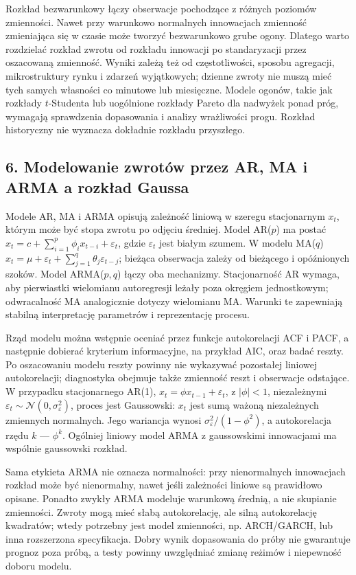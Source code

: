 \documentclass[11pt,a4paper]{article}
\begin{document}
Rozkład bezwarunkowy łączy obserwacje pochodzące z różnych poziomów zmienności. Nawet przy warunkowo normalnych innowacjach zmienność zmieniająca się w czasie może tworzyć bezwarunkowo grube ogony. Dlatego warto rozdzielać rozkład zwrotu od rozkładu innowacji po standaryzacji przez oszacowaną zmienność. Wyniki zależą też od częstotliwości, sposobu agregacji, mikrostruktury rynku i zdarzeń wyjątkowych; dzienne zwroty nie muszą mieć tych samych własności co minutowe lub miesięczne. Modele ogonów, takie jak rozkłady \(t\)-Studenta lub uogólnione rozkłady Pareto dla nadwyżek ponad próg, wymagają sprawdzenia dopasowania i analizy wrażliwości progu. Rozkład historyczny nie wyznacza dokładnie rozkładu przyszłego.

\subsection{6. Modelowanie zwrotów przez AR, MA i ARMA a rozkład Gaussa}

Modele AR, MA i ARMA opisują zależność liniową w szeregu stacjonarnym \(x_t\), którym może być stopa zwrotu po odjęciu średniej. Model AR(\(p\)) ma postać \(x_t=c+\sum_{i=1}^{p}\phi_i x_{t-i}+\varepsilon_t\), gdzie \(\varepsilon_t\) jest białym szumem. W modelu MA(\(q\)) \(x_t=\mu+\varepsilon_t+\sum_{j=1}^{q}\theta_j\varepsilon_{t-j}\); bieżąca obserwacja zależy od bieżącego i opóźnionych szoków. Model ARMA(\(p,q\)) łączy oba mechanizmy. Stacjonarność AR wymaga, aby pierwiastki wielomianu autoregresji leżały poza okręgiem jednostkowym; odwracalność MA analogicznie dotyczy wielomianu MA. Warunki te zapewniają stabilną interpretację parametrów i reprezentację procesu.

Rząd modelu można wstępnie oceniać przez funkcje autokorelacji ACF i PACF, a następnie dobierać kryterium informacyjne, na przykład AIC, oraz badać reszty. Po oszacowaniu modelu reszty powinny nie wykazywać pozostałej liniowej autokorelacji; diagnostyka obejmuje także zmienność reszt i obserwacje odstające. W przypadku stacjonarnego AR(1), \(x_t=\phi x_{t-1}+\varepsilon_t\), z \(|\phi|<1\), niezależnymi \(\varepsilon_t\sim\mathcal N(0,\sigma_\varepsilon^2)\), proces jest Gaussowski: \(x_t\) jest sumą ważoną niezależnych zmiennych normalnych. Jego wariancja wynosi \(\sigma_\varepsilon^2/(1-\phi^2)\), a autokorelacja rzędu \(k\) — \(\phi^k\). Ogólniej liniowy model ARMA z gaussowskimi innowacjami ma wspólnie gaussowski rozkład.

Sama etykieta ARMA nie oznacza normalności: przy nienormalnych innowacjach rozkład może być nienormalny, nawet jeśli zależności liniowe są prawidłowo opisane. Ponadto zwykły ARMA modeluje warunkową średnią, a nie skupianie zmienności. Zwroty mogą mieć słabą autokorelację, ale silną autokorelację kwadratów; wtedy potrzebny jest model zmienności, np. ARCH/GARCH, lub inna rozszerzona specyfikacja. Dobry wynik dopasowania do próby nie gwarantuje prognoz poza próbą, a testy powinny uwzględniać zmianę reżimów i niepewność doboru modelu.
\end{document}
